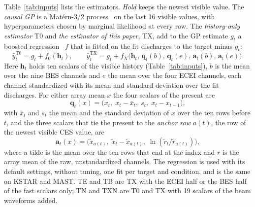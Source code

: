 \documentclass[11pt,a4paper]{article}
\begin{document}
Table~\ref{tab:inputs} lists the estimators. \emph{Hold} keeps the newest visible value.
The \emph{causal GP} is a Mat\'ern-3/2 process~\citep{rasmussen2006} on the last 16
visible values, with hyperparameters chosen by marginal likelihood at every row. The
\emph{history-only estimator} T0 and \emph{the estimator of this paper}, TX, add to the GP
estimate $g_t$ a boosted
regression~\citep{Friedman2001GreedyFunction,Pedregosa2011ScikitLearn} $f$ that is fitted
on the fit discharges to the target minus $g_t$:
\begin{equation}
  \hat y_t^{\mathrm{T0}} = g_t + f_0(\mathbf h_t), \qquad
  \hat y_t^{\mathrm{TX}} = g_t + f_X\bigl(\mathbf h_t,\, \mathbf q_t(b),\, \mathbf q_t(e),\,
  \mathbf a_t(b),\, \mathbf a_t(e)\bigr).
  \label{eq:est}
\end{equation}
Here $\mathbf h_t$ holds ten scalars of the visible history (Table~\ref{tab:inputs}), $b$
is the mean over the nine BES channels and $e$ the mean over the four ECEI channels, each
channel standardized with its mean and standard deviation over the fit discharges. For
either array mean $x$ the four scalars of the present are
\begin{equation}
  \mathbf q_t(x) = \bigl(x_t,\; x_t - \bar x_t,\; s_t,\; x_t - x_{t-1}\bigr),
  \label{eq:fast}
\end{equation}
with $\bar x_t$ and $s_t$ the mean and the standard deviation of $x$ over the ten rows
before $t$, and the three scalars that tie the present to the \emph{anchor row} $a(t)$,
the row of the newest visible CES value, are
\begin{equation}
  \mathbf a_t(x) = \bigl(\tilde x_{a(t)},\; \tilde x_t - \tilde x_{a(t)},\;
  \ln(\tilde r_t / \tilde r_{a(t)})\bigr),
  \label{eq:anchor}
\end{equation}
where a tilde is the mean over the ten rows that end at the index and $r$ is the array
mean of the raw, unstandardized channels. The regression is used with its default
settings, without tuning, one fit per target and condition, and is the same on KSTAR and
MAST. TE and TB are TX with the ECEI half or the BES half of the fast scalars only; TN and
TXN are T0 and TX with 19 scalars of the beam waveforms added.
\end{document}

